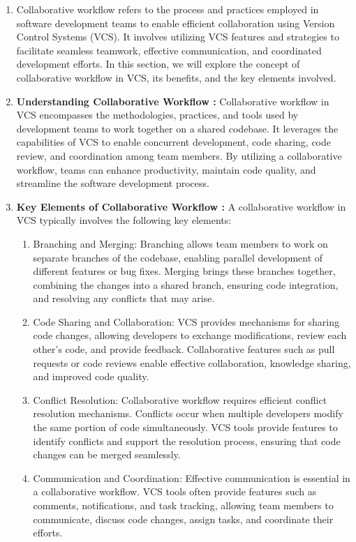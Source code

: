 \begin{enumerate}
    \item Collaborative workflow refers to the process and practices employed in software development teams to enable efficient collaboration using Version Control Systems (VCS). It involves utilizing VCS features and strategies to facilitate seamless teamwork, effective communication, and coordinated development efforts. In this section, we will explore the concept of collaborative workflow in VCS, its benefits, and the key elements involved.
    \item \textbf{Understanding Collaborative Workflow : }Collaborative workflow in VCS encompasses the methodologies, practices, and tools used by development teams to work together on a shared codebase. It leverages the capabilities of VCS to enable concurrent development, code sharing, code review, and coordination among team members. By utilizing a collaborative workflow, teams can enhance productivity, maintain code quality, and streamline the software development process.
    \item \textbf{Key Elements of Collaborative Workflow : }A collaborative workflow in VCS typically involves the following key elements:
    \begin{enumerate}
        \item Branching and Merging: Branching allows team members to work on separate branches of the codebase, enabling parallel development of different features or bug fixes. Merging brings these branches together, combining the changes into a shared branch, ensuring code integration, and resolving any conflicts that may arise.
        \item Code Sharing and Collaboration: VCS provides mechanisms for sharing code changes, allowing developers to exchange modifications, review each other's code, and provide feedback. Collaborative features such as pull requests or code reviews enable effective collaboration, knowledge sharing, and improved code quality.
        \item Conflict Resolution: Collaborative workflow requires efficient conflict resolution mechanisms. Conflicts occur when multiple developers modify the same portion of code simultaneously. VCS tools provide features to identify conflicts and support the resolution process, ensuring that code changes can be merged seamlessly.
        \item Communication and Coordination: Effective communication is essential in a collaborative workflow. VCS tools often provide features such as comments, notifications, and task tracking, allowing team members to communicate, discuss code changes, assign tasks, and coordinate their efforts.

\end{enumerate}
\end{enumerate}

